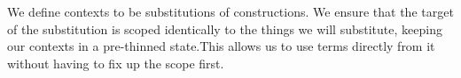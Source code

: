 We define contexts to be substitutions of constructions. We ensure that the target
of the substitution is scoped identically to the things we will substitute,
keeping our contexts in a pre-thinned state.This allows us to use terms
directly from it without having to fix up the scope first.
\begin{code}%
\>[0]\AgdaSpace{}%
\AgdaSymbol{:}\AgdaSpace{}%
\AgdaSpace{}%
\AgdaSpace{}%
\<%
\\
\>[0]\AgdaSpace{}%
\AgdaSpace{}%
\AgdaSymbol{=}\AgdaSpace{}%
\AgdaSpace{}%
\AgdaOperator{\AgdaFunction{⇒[}}\AgdaSpace{}%
\AgdaSpace{}%
\AgdaOperator{\AgdaFunction{]}}\AgdaSpace{}%
\<%
\end{code}
